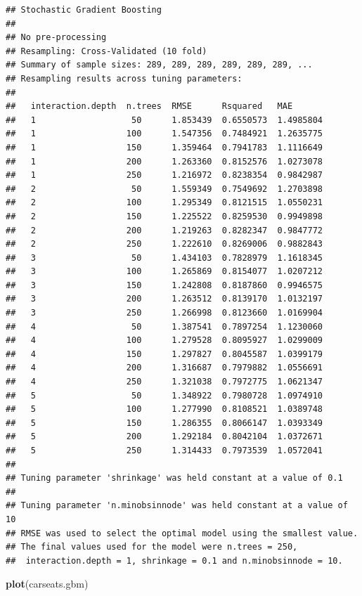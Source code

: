 \documentclass[]{book}
\newenvironment{Shaded}{\begin{snugshade}}{\end{snugshade}}
\newcommand{\KeywordTok}[1]{\textcolor[rgb]{0.13,0.29,0.53}{\textbf{#1}}}
\newcommand{\NormalTok}[1]{#1}
\begin{document}
\begin{verbatim}
## Stochastic Gradient Boosting 
## 
## No pre-processing
## Resampling: Cross-Validated (10 fold) 
## Summary of sample sizes: 289, 289, 289, 289, 289, 289, ... 
## Resampling results across tuning parameters:
## 
##   interaction.depth  n.trees  RMSE      Rsquared   MAE      
##   1                   50      1.853439  0.6550573  1.4985804
##   1                  100      1.547356  0.7484921  1.2635775
##   1                  150      1.359464  0.7941783  1.1116649
##   1                  200      1.263360  0.8152576  1.0273078
##   1                  250      1.216972  0.8238354  0.9842987
##   2                   50      1.559349  0.7549692  1.2703898
##   2                  100      1.295349  0.8121515  1.0550231
##   2                  150      1.225522  0.8259530  0.9949898
##   2                  200      1.219263  0.8282347  0.9847772
##   2                  250      1.222610  0.8269006  0.9882843
##   3                   50      1.434103  0.7828979  1.1618345
##   3                  100      1.265869  0.8154077  1.0207212
##   3                  150      1.242808  0.8187860  0.9946575
##   3                  200      1.263512  0.8139170  1.0132197
##   3                  250      1.266998  0.8123660  1.0169904
##   4                   50      1.387541  0.7897254  1.1230060
##   4                  100      1.279528  0.8095927  1.0299009
##   4                  150      1.297827  0.8045587  1.0399179
##   4                  200      1.316687  0.7979882  1.0556691
##   4                  250      1.321038  0.7972775  1.0621347
##   5                   50      1.348922  0.7980728  1.0974910
##   5                  100      1.277990  0.8108521  1.0389748
##   5                  150      1.286355  0.8066147  1.0393349
##   5                  200      1.292184  0.8042104  1.0372671
##   5                  250      1.314433  0.7973539  1.0572041
## 
## Tuning parameter 'shrinkage' was held constant at a value of 0.1
## 
## Tuning parameter 'n.minobsinnode' was held constant at a value of 10
## RMSE was used to select the optimal model using the smallest value.
## The final values used for the model were n.trees = 250,
##  interaction.depth = 1, shrinkage = 0.1 and n.minobsinnode = 10.
\end{verbatim}

\begin{Shaded}
\begin{Highlighting}[]
\KeywordTok{plot}\NormalTok{(carseats.gbm)}
\end{Highlighting}
\end{Shaded}
\end{document}

